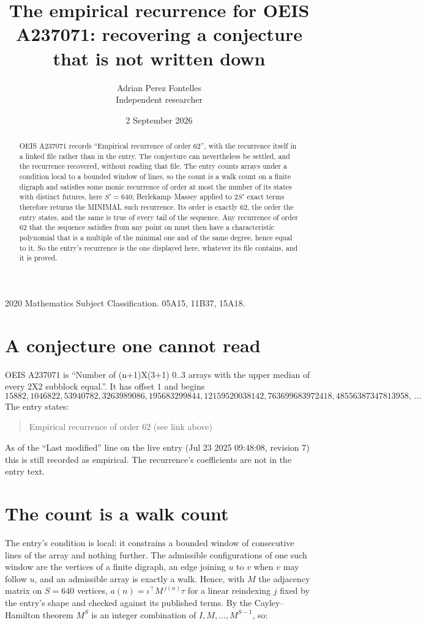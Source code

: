\documentclass[11pt,a4paper]{article}
\title{The empirical recurrence for OEIS A237071: recovering a conjecture that is not written down}
\author{Adrian Perez Fontelles\\ \small Independent researcher}
\date{2 September 2026}
\theoremstyle{plain}
\theoremstyle{definition}
\begin{document}
\maketitle

\begin{abstract}
OEIS A237071 records ``Empirical recurrence of order $62$'', with the recurrence itself in a
linked file rather than in the entry. The conjecture can nevertheless be settled, and the
recurrence recovered, without reading that file. The entry counts arrays under a condition
local to a bounded window of lines, so the count is a walk count on a finite digraph and
satisfies some monic recurrence of order at most the number of its states with distinct
futures, here $S'=640$; Berlekamp--Massey applied to $2S'$ exact
terms therefore returns the MINIMAL such recurrence. Its order is exactly $62$, the order
the entry states, and the same is true of every tail of the sequence. Any recurrence of order
$62$ that the sequence satisfies from any point on must then have a characteristic
polynomial that is a multiple of the minimal one and of the same degree, hence equal to it. So
the entry's recurrence is the one displayed here, whatever its file contains, and it is
proved.
\end{abstract}

\noindent\small 2020 Mathematics Subject Classification. 05A15, 11B37, 15A18.\normalsize

\section{A conjecture one cannot read}

OEIS A237071 is ``Number of (n+1)X(3+1) 0..3 arrays with the upper median of every 2X2 subblock equal.''. It has offset $1$ and begins
\[
15882, 1046822, 53940782, 3263989086, 195683299844, 12159520038142, 763699683972418, 48556387347813958,\ \dots
\]
The entry states:
\begin{quote}
Empirical recurrence of order 62 (see link above)
\end{quote}
As of the ``Last modified'' line on the live entry (Jul 23 2025 09:48:08, revision 7) this is still
recorded as empirical. The recurrence's coefficients are not in the entry text.

\section{The count is a walk count}

The entry's condition is local: it constrains a bounded window of consecutive lines of the
array and nothing further. The admissible configurations of one such window are the vertices
of a finite digraph, an edge joining $u$ to $v$ when $v$ may follow $u$, and an admissible
array is exactly a walk. Hence, with $M$ the adjacency matrix on $S=640$ vertices,
$a(n)=\iota^{\!\top}M^{\,j(n)}\tau$ for a linear reindexing $j$ fixed by the entry's shape
and checked against its published terms. By the Cayley--Hamilton theorem $M^{S}$ is an
integer combination of $I,M,\dots,M^{S-1}$, so:
\end{document}
